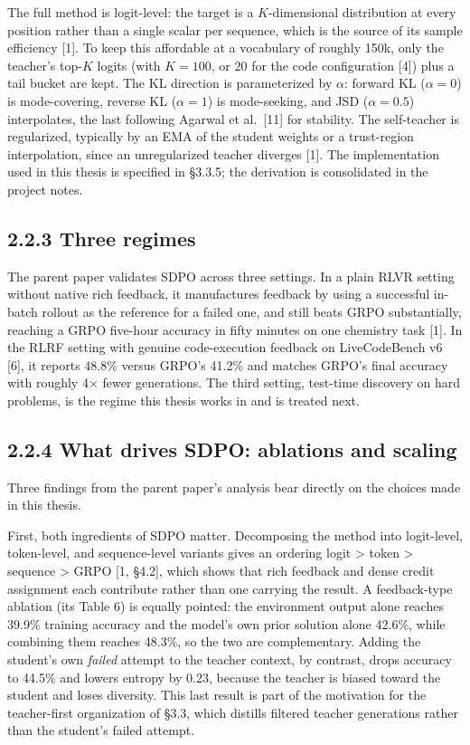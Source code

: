 The full method is logit-level: the target is a \(K\)-dimensional distribution at every position rather than a single scalar per sequence, which is the source of its sample efficiency {[}1{]}. To keep this affordable at a vocabulary of roughly 150k, only the teacher's top-\(K\) logits (with \(K{=}100\), or 20 for the code configuration {[}4{]}) plus a tail bucket are kept. The KL direction is parameterized by \(\alpha\): forward KL (\(\alpha{=}0\)) is mode-covering, reverse KL (\(\alpha{=}1\)) is mode-seeking, and JSD (\(\alpha{=}0.5\)) interpolates, the last following Agarwal et al.~{[}11{]} for stability. The self-teacher is regularized, typically by an EMA of the student weights or a trust-region interpolation, since an unregularized teacher diverges {[}1{]}. The implementation used in this thesis is specified in §3.3.5; the derivation is consolidated in the project notes.

\subsection{2.2.3 Three regimes}\label{three-regimes}

The parent paper validates SDPO across three settings. In a plain RLVR setting without native rich feedback, it manufactures feedback by using a successful in-batch rollout as the reference for a failed one, and still beats GRPO substantially, reaching a GRPO five-hour accuracy in fifty minutes on one chemistry task {[}1{]}. In the RLRF setting with genuine code-execution feedback on LiveCodeBench v6 {[}6{]}, it reports 48.8\% versus GRPO's 41.2\% and matches GRPO's final accuracy with roughly 4× fewer generations. The third setting, test-time discovery on hard problems, is the regime this thesis works in and is treated next.

\subsection{2.2.4 What drives SDPO: ablations and scaling}\label{what-drives-sdpo-ablations-and-scaling}

Three findings from the parent paper's analysis bear directly on the choices made in this thesis.

First, both ingredients of SDPO matter. Decomposing the method into logit-level, token-level, and sequence-level variants gives an ordering logit \textgreater{} token \textgreater{} sequence \textgreater{} GRPO {[}1, §4.2{]}, which shows that rich feedback and dense credit assignment each contribute rather than one carrying the result. A feedback-type ablation (its Table 6) is equally pointed: the environment output alone reaches 39.9\% training accuracy and the model's own prior solution alone 42.6\%, while combining them reaches 48.3\%, so the two are complementary. Adding the student's own \emph{failed} attempt to the teacher context, by contrast, drops accuracy to 44.5\% and lowers entropy by 0.23, because the teacher is biased toward the student and loses diversity. This last result is part of the motivation for the teacher-first organization of §3.3, which distills filtered teacher generations rather than the student's failed attempt.

